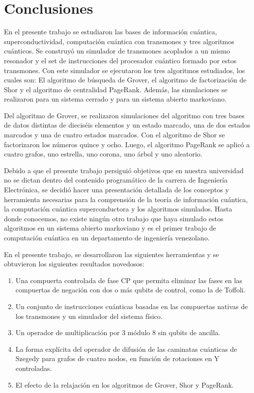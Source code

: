 \chapter{Conclusiones}

En el presente trabajo se estudiaron las bases de información cuántica, superconductividad, computación cuántica con transmones y tres algoritmos cuánticos. Se construyó un simulador de transmones acoplados a un mismo resonador y el set de instrucciones del procesador cuántico formado por estos transmones. Con este simulador se ejecutaron los tres algoritmos estudiados, los cuales son: El algoritmo de búsqueda de Grover, el algoritmo de factorización de Shor y el algoritmo de centralidad PageRank. Además, las simulaciones se realizaron para un sistema cerrado y para un sistema abierto markoviano.

Del algoritmo de Grover, se realizaron simulaciones del algoritmo con tres bases de datos distintas de dieciséis elementos y un estado marcado, una de dos estados marcados y una de cuatro estados marcados. Con el algoritmo de Shor se factorizaron los números quince y ocho. Luego, el algoritmo PageRank se aplicó a cuatro grafos, uno estrella, uno corona, uno árbol y uno aleatorio.

Debido a que el presente trabajo persiguió objetivos que en nuestra universidad no se dictan dentro del contenido programático de la carrera de Ingeniería Electrónica, se decidió hacer una presentación detallada de los conceptos y herramienta necesarias para la comprensión de la teoría de información cuántica, la computación cuántica superconductora y los algoritmos simulados. Hasta donde conocemos, no existe ningún otro trabajo que haya simulado estos algoritmos en un sistema abierto markoviano y es el primer trabajo de computación cuántica en un departamento de ingeniería venezolano.

En el presente trabajo, se desarrollaron las siguientes herramientas y se obtuvieron los siguientes resultados novedosos:

\begin{enumerate}
    \item Una compuerta controlada de fase CP que permita eliminar las fases en las compuertas de negación con dos o más qubits de control, como la de Toffoli.
    \item Un conjunto de instrucciones cuánticas basadas en las compuertas nativas de los transmones y un simulador del sistema físico.
    \item Un operador de multiplicación por 3 módulo 8 sin qubits de ancilla.
    \item La forma explícita del operador de difusión de las caminatas cuánticas de Szegedy para grafos de cuatro nodos, en función de rotaciones en Y controladas.
    \item El efecto de la relajación en los algoritmos de Grover, Shor y PageRank.
\end{enumerate}

